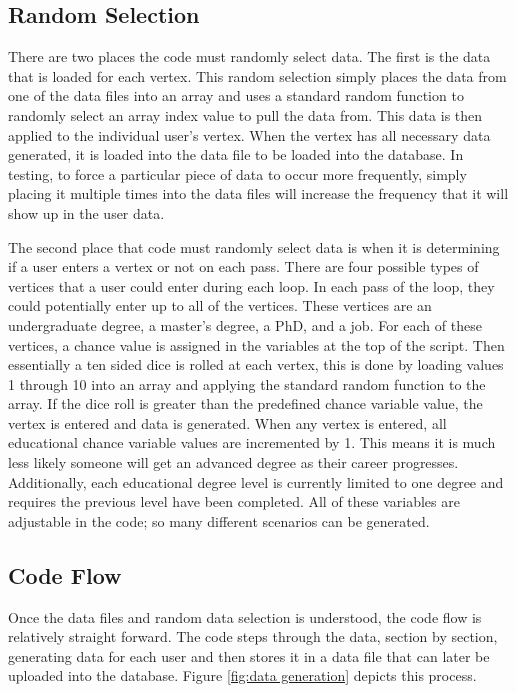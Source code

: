 \subsection{Random Selection}
There are two places the code must randomly select data.  The first is the
data that is loaded for each vertex.  This random selection simply places the data
from one of the data files into an array and uses a standard random function
to randomly select an array index value to pull the data from.  This data is then
applied to the individual user's vertex.  When the vertex has all necessary data
generated, it is loaded into the data file to be loaded into the database.  In
testing, to force a particular piece of data to occur more frequently,
simply placing it multiple times into the data files will increase the
frequency that it will show up in the user data.

The second place that code must randomly select data is when it is determining
if a user enters a vertex or not on each pass.  There are four possible types
of vertices that a user could enter during each loop.  In each pass of the loop,
they could potentially enter up to all of the vertices.  These vertices are an
undergraduate degree, a master's degree, a PhD, and a job.  For each of these
vertices, a chance value is assigned in the variables at the top of the script. 
Then essentially a ten sided dice is rolled at each vertex, this is done by
loading values 1 through 10 into an array and applying the standard random
function to the array.  If the dice roll is greater than the predefined chance
variable value, the vertex is entered and data is generated.  When any vertex is
entered, all educational chance variable values are incremented by 1.  This
means it is much less likely someone will get an advanced degree as their career
progresses.  Additionally, each educational degree level is currently limited to
one degree and requires the previous level have been completed.  All of these
variables are adjustable in the code; so many different scenarios can be generated.


\subsection{Code Flow}
Once the data files and random data selection is understood, the code flow is
relatively straight forward.  The code steps through the data, section by
section, generating data for each user and then stores it in a data file that
can later be uploaded into the database.  Figure \ref {fig:data generation}
depicts this process.

